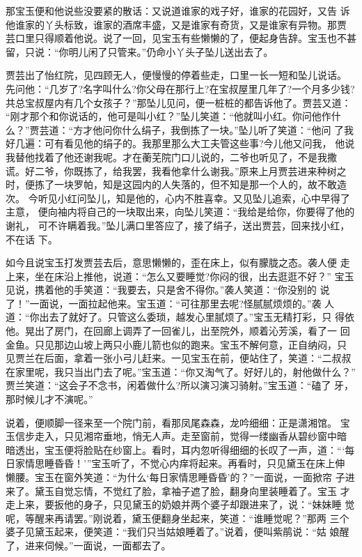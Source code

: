 那宝玉便和他说些没要紧的散话：又说道谁家的戏子好，谁家的花园好，又告
诉他谁家的丫头标致，谁家的酒席丰盛，又是谁家有奇货，又是谁家有异物。那贾
芸口里只得顺着他说。说了一回，见宝玉有些懒懒的了，便起身告辞。宝玉也不甚
留，只说：“你明儿闲了只管来。”仍命小丫头子坠儿送出去了。

贾芸出了怡红院，见四顾无人，便慢慢的停着些走，口里一长一短和坠儿说话。
先问他：“几岁了?名字叫什么?你父母在那行上?在宝叔屋里几年了?一个月多少钱?
共总宝叔屋内有几个女孩子？”那坠儿见问，便一桩桩的都告诉他了。贾芸又道：
“刚才那个和你说话的，他可是叫小红？”坠儿笑道：“他就叫小红。你问他作什
么？”贾芸道：“方才他问你什么绢子，我倒拣了一块。”坠儿听了笑道：“他问
了我好几遍：可有看见他的绢子的。我那里那么大工夫管这些事?今儿他又问我，
他说我替他找着了他还谢我呢。才在蘅芜院门口儿说的，二爷也听见了，不是我撒
谎。好二爷，你既拣了，给我罢，我看他拿什么谢我。”原来上月贾芸进来种树之
时，便拣了一块罗帕，知是这园内的人失落的，但不知是那一个人的，故不敢造次。
今听见小红问坠儿，知是他的，心内不胜喜幸。又见坠儿追索，心中早得了主意，
便向袖内将自己的一块取出来，向坠儿笑道：“我给是给你，你要得了他的谢礼，
可不许瞒着我。”坠儿满口里答应了，接了绢子，送出贾芸，回来找小红，不在话
下。

如今且说宝玉打发贾芸去后，意思懒懒的，歪在床上，似有朦胧之态。袭人便
走上来，坐在床沿上推他，说道：“怎么又要睡觉?你闷的很，出去逛逛不好？”
宝玉见说，携着他的手笑道：“我要去，只是舍不得你。”袭人笑道：“你没别的
说了！”一面说，一面拉起他来。宝玉道：“可往那里去呢?怪腻腻烦烦的。”袭
人道：“你出去了就好了。只管这么委琐，越发心里腻烦了。”宝玉无精打彩，只
得依他。晃出了房门，在回廊上调弄了一回雀儿，出至院外，顺着沁芳溪，看了一
回金鱼。只见那边山坡上两只小鹿儿箭也似的跑来。宝玉不解何意，正自纳闷，只
见贾兰在后面，拿着一张小弓儿赶来。一见宝玉在前，便站住了，笑道：“二叔叔
在家里呢，我只当出门去了呢。”宝玉道：“你又淘气了。好好儿的，射他做什么？”
贾兰笑道：“这会子不念书，闲着做什么?所以演习演习骑射。”宝玉道：“磕了
牙，那时候儿才不演呢。”

说着，便顺脚一径来至一个院门前，看那凤尾森森，龙吟细细：正是潇湘馆。
宝玉信步走入，只见湘帘垂地，悄无人声。走至窗前，觉得一缕幽香从碧纱窗中暗
暗透出，宝玉便将脸贴在纱窗上。看时，耳内忽听得细细的长叹了一声，道：“‘每
日家情思睡昏昏！’”宝玉听了，不觉心内痒将起来。再看时，只见黛玉在床上伸
懒腰。宝玉在窗外笑道：“为什么‘每日家情思睡昏昏’的？”一面说，一面掀帘
子进来了。黛玉自觉忘情，不觉红了脸，拿袖子遮了脸，翻身向里装睡着了。宝玉
才走上来，要扳他的身子，只见黛玉的奶娘并两个婆子却跟进来了，说：“妹妹睡
觉呢，等醒来再请罢。”刚说着，黛玉便翻身坐起来，笑道：“谁睡觉呢？”那两
三个婆子见黛玉起来，便笑道：“我们只当姑娘睡着了。”说着，便叫紫鹃说：“姑
娘醒了，进来伺候。”一面说，一面都去了。

